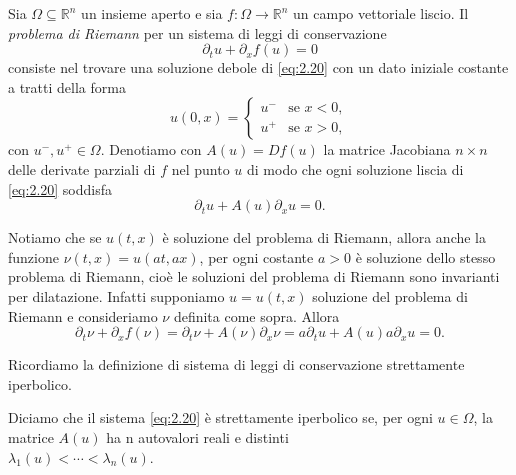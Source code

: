 Sia $\Omega\subseteq\mathbb{R}^{n}$ un insieme aperto e sia $f\colon\Omega\rightarrow\mathbb{R}^{n}$ un campo vettoriale liscio. Il \textit{problema di Riemann} per un sistema di leggi di conservazione 
\begin{equation}\label{eq:2.20}
    \partial_{t}u+\partial_{x}f(u)=0
\end{equation}
consiste nel trovare una soluzione debole di \eqref{eq:2.20} con un dato iniziale costante a tratti della forma
\begin{equation}\label{eq:2.21}
    u(0,x) = 
    \begin{cases}
        u^{-} & \text{se } x<0,\\
        u^{+} & \text{se } x>0,
    \end{cases}
\end{equation}
con $u^{-}, u^{+} \in\Omega$.
Denotiamo con $A(u) = Df(u)$ la matrice Jacobiana $n\times n$ delle derivate parziali di $f$ nel punto $u$ di modo che ogni soluzione liscia di \eqref{eq:2.20} soddisfa 
\begin{equation}\label{eq:2.22}
    \partial_{t}u+A(u)\partial_{x}u=0.
\end{equation}
\begin{osservazione}
    Notiamo che se $u(t,x)$ è soluzione del problema di Riemann, allora anche la funzione $\nu(t,x) = u(at, ax)$, per ogni costante $a>0$ è soluzione dello stesso problema di Riemann, cioè le soluzioni del problema di Riemann sono invarianti per dilatazione. Infatti supponiamo $u = u(t,x)$ soluzione del problema di Riemann e consideriamo $\nu$ definita come sopra. Allora
    \begin{equation*}
        \partial_{t}\nu+\partial_{x}f(\nu) = \partial_{t}\nu+A(\nu)\partial_{x}\nu = a\partial_{t}u+A(u)a\partial_{x}u = 0.
    \end{equation*}
\end{osservazione}
Ricordiamo la definizione di sistema di leggi di conservazione strettamente iperbolico.
\begin{definizione}
    Diciamo che il sistema \eqref{eq:2.20} è strettamente iperbolico se, per ogni $u\in\Omega$, la matrice $A(u)$ ha n autovalori reali e distinti\\ $\lambda_{1}(u)< \cdots < \lambda_{n}(u)$.
\end{definizione}

